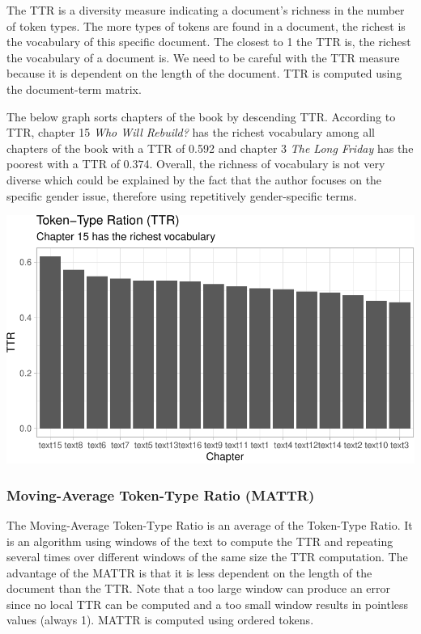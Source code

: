 \documentclass[
]{article}
\begin{document}
The TTR is a diversity measure indicating a document's richness in the
number of token types. The more types of tokens are found in a document,
the richest is the vocabulary of this specific document. The closest to
1 the TTR is, the richest the vocabulary of a document is. We need to be
careful with the TTR measure because it is dependent on the length of
the document. TTR is computed using the document-term matrix.

The below graph sorts chapters of the book by descending TTR. According
to TTR, chapter 15 \emph{Who Will Rebuild?} has the richest vocabulary
among all chapters of the book with a TTR of 0.592 and chapter 3
\emph{The Long Friday} has the poorest with a TTR of 0.374. Overall, the
richness of vocabulary is not very diverse which could be explained by
the fact that the author focuses on the specific gender issue, therefore
using repetitively gender-specific terms.

\begin{center}\includegraphics[width=0.7\linewidth]{report_files/figure-latex/TTR plot-1} \end{center}

\hypertarget{moving-average-token-type-ratio-mattr}{%
\subsubsection{Moving-Average Token-Type Ratio
(MATTR)}\label{moving-average-token-type-ratio-mattr}}

The Moving-Average Token-Type Ratio is an average of the Token-Type
Ratio. It is an algorithm using windows of the text to compute the TTR
and repeating several times over different windows of the same size the
TTR computation. The advantage of the MATTR is that it is less dependent
on the length of the document than the TTR. Note that a too large window
can produce an error since no local TTR can be computed and a too small
window results in pointless values (always 1). MATTR is computed using
ordered tokens.
\end{document}
